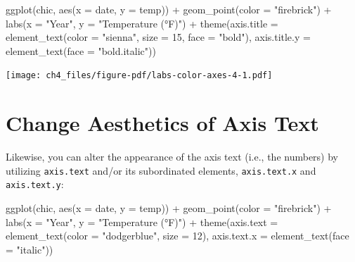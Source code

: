 \documentclass[
  letterpaper,
]{scrbook}
\newenvironment{Shaded}{\begin{snugshade}}{\end{snugshade}}
\newcommand{\AttributeTok}[1]{\textcolor[rgb]{0.40,0.45,0.13}{#1}}
\newcommand{\DecValTok}[1]{\textcolor[rgb]{0.68,0.00,0.00}{#1}}
\newcommand{\FunctionTok}[1]{\textcolor[rgb]{0.28,0.35,0.67}{#1}}
\newcommand{\NormalTok}[1]{\textcolor[rgb]{0.00,0.23,0.31}{#1}}
\newcommand{\SpecialCharTok}[1]{\textcolor[rgb]{0.37,0.37,0.37}{#1}}
\newcommand{\StringTok}[1]{\textcolor[rgb]{0.13,0.47,0.30}{#1}}
\begin{document}
\begin{Shaded}
\begin{Highlighting}[]
\FunctionTok{ggplot}\NormalTok{(chic, }\FunctionTok{aes}\NormalTok{(}\AttributeTok{x =}\NormalTok{ date, }\AttributeTok{y =}\NormalTok{ temp)) }\SpecialCharTok{+}
  \FunctionTok{geom\_point}\NormalTok{(}\AttributeTok{color =} \StringTok{"firebrick"}\NormalTok{) }\SpecialCharTok{+}
  \FunctionTok{labs}\NormalTok{(}\AttributeTok{x =} \StringTok{"Year"}\NormalTok{, }\AttributeTok{y =} \StringTok{"Temperature (°F)"}\NormalTok{) }\SpecialCharTok{+}
  \FunctionTok{theme}\NormalTok{(}\AttributeTok{axis.title =} \FunctionTok{element\_text}\NormalTok{(}\AttributeTok{color =} \StringTok{"sienna"}\NormalTok{, }\AttributeTok{size =} \DecValTok{15}\NormalTok{, }\AttributeTok{face =} \StringTok{"bold"}\NormalTok{),}
        \AttributeTok{axis.title.y =} \FunctionTok{element\_text}\NormalTok{(}\AttributeTok{face =} \StringTok{"bold.italic"}\NormalTok{))}
\end{Highlighting}
\end{Shaded}

\texttt{[image: ch4\_files/figure-pdf/labs-color-axes-4-1.pdf]}

\section{Change Aesthetics of Axis
Text}\label{change-aesthetics-of-axis-text}

Likewise, you can alter the appearance of the axis text (i.e., the
numbers) by utilizing \texttt{axis.text} and/or its subordinated
elements, \texttt{axis.text.x} and \texttt{axis.text.y}:

\begin{Shaded}
\begin{Highlighting}[]
\FunctionTok{ggplot}\NormalTok{(chic, }\FunctionTok{aes}\NormalTok{(}\AttributeTok{x =}\NormalTok{ date, }\AttributeTok{y =}\NormalTok{ temp)) }\SpecialCharTok{+}
  \FunctionTok{geom\_point}\NormalTok{(}\AttributeTok{color =} \StringTok{"firebrick"}\NormalTok{) }\SpecialCharTok{+}
  \FunctionTok{labs}\NormalTok{(}\AttributeTok{x =} \StringTok{"Year"}\NormalTok{, }\AttributeTok{y =} \StringTok{"Temperature (°F)"}\NormalTok{) }\SpecialCharTok{+}
  \FunctionTok{theme}\NormalTok{(}\AttributeTok{axis.text =} \FunctionTok{element\_text}\NormalTok{(}\AttributeTok{color =} \StringTok{"dodgerblue"}\NormalTok{, }\AttributeTok{size =} \DecValTok{12}\NormalTok{),}
        \AttributeTok{axis.text.x =} \FunctionTok{element\_text}\NormalTok{(}\AttributeTok{face =} \StringTok{"italic"}\NormalTok{))}
\end{Highlighting}
\end{Shaded}
\end{document}
